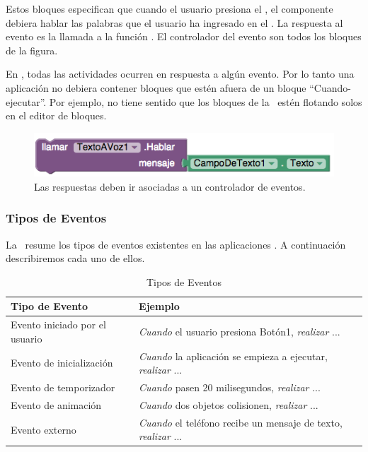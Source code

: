 \documentclass[letterpaper]{article}
\begin{document}
Estos bloques especifican que cuando el usuario presiona el
, el componente  debiera hablar
las palabras que el usuario ha ingresado en el
. La respuesta al evento
 es la llamada a la función
. El controlador del evento son todos los
bloques de la figura.

En \AppInventor, todas las actividades ocurren en respuesta a algún
evento. Por lo tanto una aplicación no debiera contener bloques que
estén afuera de un bloque “Cuando-ejecutar”. Por ejemplo, no tiene
sentido que los bloques de la~ estén flotando solos
en el editor de bloques.

\begin{figure}[H]
\centering
\includegraphics[scale=0.5]{figures/SpeakIt2}
\caption{Las respuestas deben ir asociadas a un controlador de eventos.}
\label{fig:speakit2}
\end{figure}

\subsubsection*{Tipos de Eventos}

La~ resume los tipos de eventos existentes en las
aplicaciones \AppInventor. A continuación describiremos cada uno de
ellos.

\begin{table}[H]
\begin{small}
\begin{tabular}{|l|l|}
  \hline
  \textbf{Tipo de Evento} & \textbf{Ejemplo}\\
  \hline
  Evento iniciado por el usuario & \emph{Cuando} el usuario presiona
  Botón1, \emph{realizar} ...\\
  \hline
  Evento de inicialización & \emph{Cuando} la aplicación se empieza a
  ejecutar, \emph{realizar} ...\\
  \hline
  Evento de temporizador & \emph{Cuando} pasen 20 milisegundos,
  \emph{realizar} ...\\
\hline
Evento de animación & \emph{Cuando} dos objetos colisionen,
\emph{realizar} ...\\
\hline
Evento externo & \emph{Cuando} el teléfono recibe un mensaje de texto,
\emph{realizar} ...\\
\hline
\end{tabular}
\end{small}
\caption{Tipos de Eventos}
\label{fig:eventTypes}
\end{table}
\end{document}
